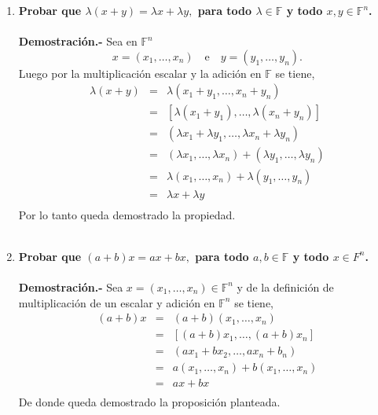 \begin{multicols}{2}
\begin{enumerate}
     \item \textbf{\boldmath Probar que $\lambda(x+y)=\lambda x + \lambda y,$ para todo $\lambda \in \mathbb{F}$ y todo $x,y\in \mathbb{F}^n$.}\\\\
	 \textbf{Demostración.-}\; Sea en $\mathbb{F}^n$ $$x=(x_1,\ldots,x_n)\quad \mbox{e}\quad y=(y_1,\ldots,y_n).$$ 
	 Luego por la multiplicación escalar y la adición en $\mathbb{F}$ se tiene,  
    	 $$\begin{array}{rcl}
	     \lambda(x+y)&=&\lambda(x_1+y_1,\ldots,x_n+y_n)\\
			 &=&[\lambda(x_1+y_1),\ldots,\lambda(x_n+y_n)]\\
			 &=&(\lambda x_1 + \lambda y_1,\ldots,\lambda x_n + \lambda y_n)\\
			 &=&(\lambda x_1,\ldots,\lambda x_n)+(\lambda y_1,\ldots,\lambda y_n)\\
			 &=&\lambda(x_1,\ldots,x_n)+\lambda(y_1,\ldots,y_n)\\
			 &=&\lambda x + \lambda y\\
	 \end{array}$$
	Por lo tanto queda demostrado la propiedad.\\\\

    \item \textbf{\boldmath Probar que $(a+b)x=ax+bx,$ para todo $a,b\in \mathbb{F}$ y todo $x\in F^n$.}\\\\
	\textbf{Demostración.-}\; Sea $x=(x_1,\ldots,x_n)\in \mathbb{F}^n$ y de la definición de multiplicación de un escalar y adición en $\mathbb{F}^n$ se tiene,
	$$\begin{array}{rcl}
	     (a+b)x&=&(a+b)(x_1,\ldots,x_n)\\
		   &=&[(a+b)x_1,\ldots,(a+b)x_n]\\
		   &=&(ax_1+bx_2,\ldots,a x_n + b_n)\\
		   &=&a(x_1,\ldots, x_n)+b( x_1,\ldots, x_n)\\
		   &=&ax + bx\\
       \end{array}$$
       De donde queda demostrado la proposición planteada.\\\\ 


\end{enumerate}
\end{multicols}
